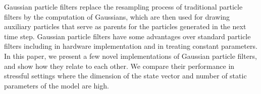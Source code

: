 Gaussian particle filters replace the resampling process of traditional
particle filters by the computation of Gaussians, which are then used
for drawing auxiliary particles that serve as parents for the particles
generated in the next time step. Gaussian particle filters have some
advantages over standard particle filters including in hardware
implementation and in treating constant parameters. In this paper,
we present a few novel implementations of Gaussian particle filters,
and show how they relate to each other. We compare their
performance in stressful settings where the dimension of the state
vector and number of static parameters of the model are high.